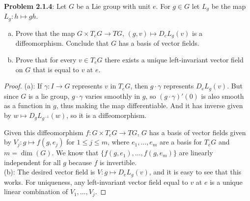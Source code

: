 \documentclass{amsart}
\begin{document}
	\textbf{Problem 2.1.4}: Let $G$ be a Lie group with unit $e$. For $g\in G$ let $L_g$ be the map $L_g:h\mapsto gh$.
	\begin{enumerate}[(a)]
		\item Prove that the map $G\times T_e G\to TG$, $(g,v)\mapsto D_eL_g(v)$ is a diffeomorphism. Conclude that $G$ has a basis of vector fields.
		\item Prove that for every $v\in T_eG$ there exists a unique left-invariant vector field on $G$ that is equal to $v$ at $e$.
	\end{enumerate} 
	\begin{proof}
		(a): If $\gamma:I\to G$ represents $v$ in $T_eG$, then $g\cdot \gamma$ represents $D_eL_g(v)$. But since $G$ is a lie group, $g\cdot \gamma$ varies smoothly in $g$, so $(g\cdot \gamma)'(0)$ is also smooth as a function in $g$, thus making the map differentiable. And it has inverse given by $w\mapsto D_gL_{g^{-1}}(w)$, so it is a diffeomorphism.
		
		Given this diffeomorphism $f:G\times T_eG\to TG$, $G$ has a basis of vector fields given by $V_j:g\mapsto f(g,e_j)$ for $1\leq j \leq m$, where $e_1,\dots,e_m$ are a basis for $T_eG$ and $m=\dim(G)$. We know that $\{f(g,e_1),\dots,f(g,e_m)\}$ are linearly independent for all $g$ because $f$ is invertible.\\
		
		(b): The desired vector field is $V:g\mapsto D_eL_g(v)$, and it is easy to see that this works. For uniqueness, any left-invariant vector field equal to $v$ at $e$ is a unique linear combination of $V_1,\dots,V_j$.
		
	\end{proof}
	
\end{document}
